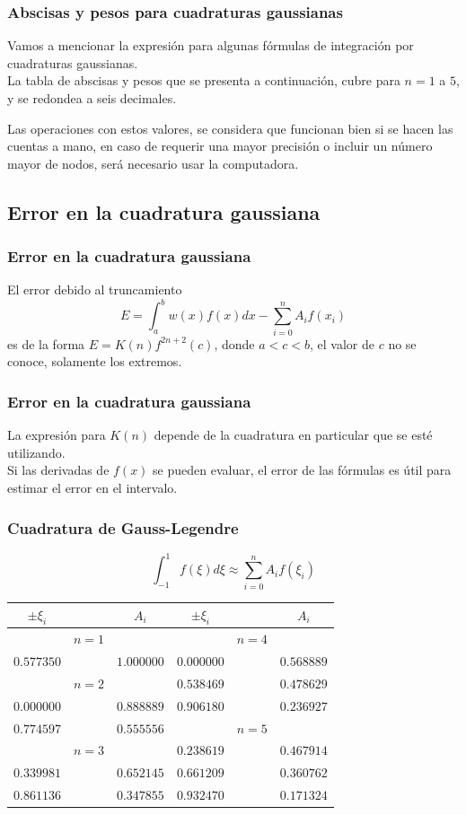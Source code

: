 \begin{frame}
\frametitle{Abscisas y pesos para cuadraturas gaussianas}
Vamos a mencionar la expresión para algunas fórmulas de integración por cuadraturas gaussianas.
\\
\bigskip
La tabla de abscisas y pesos que se presenta a continuación, cubre para $n=1$ a $5$, y se redondea a seis decimales.
\end{frame}
\begin{frame}
Las operaciones con estos valores, se considera que funcionan bien si se hacen las cuentas a mano, en caso de requerir una mayor precisión o incluir un número  mayor de nodos, será necesario usar la computadora.
\end{frame}
\subsection{Error en la cuadratura gaussiana}
\begin{frame}
\frametitle{Error en la cuadratura gaussiana}
El error debido al truncamiento
\[ E = \int_{a}^{b} w(x) f(x) dx  - \sum_{i=0}^{n} A_{i} f(x_{i})\]
es de la forma $E= K(n) f^{2n+2} (c) $, donde $a<c<b$, el valor de $c$ no se conoce, solamente los extremos.
\end{frame}
\begin{frame}
\frametitle{Error en la cuadratura gaussiana}
La expresión para $K(n)$ depende de la cuadratura en particular que se esté utilizando.
\\
\bigskip
Si las derivadas de $f(x)$ se pueden evaluar, el error de las fórmulas es útil para estimar el error en el intervalo.
\end{frame}
\begin{frame}[plain]
\frametitle{Cuadratura de Gauss-Legendre}
\[ \int_{-1}^{1} f(\xi) d \xi \approx \sum_{i=0}^{n} A_{i} f(\xi_{i}) \]
\fontsize{10}{10}\selectfont
\begin{center}
\begin{tabular}{|c c c | c c c|}
\hline
$\pm \xi_{i}$ &       & $A_{i}$    & $\pm \xi_{i}$ &       & $A_{i}$ \\ \hline
             & $n=1$ &            &               & $n=4$ &         \\ %
$0.577350$    &       & $1.000000$ & $0.000000$    &       & $0.568889$ \\ %
             & $n=2$ &            & $0.538469$    &       & $0.478629$ \\ %
$0.000000$    &       & $0.888889$ & $0.906180$    &       & $0.236927$ \\ %
$0.774597$    &       & $0.555556$ &               & $n=5$ &            \\ %
             & $n=3$ &            & $0.238619$    &       & $0.467914$ \\ %
$0.339981$    &       & $0.652145$ & $0.661209$    &       & $0.360762$ \\ %
$0.861136$    &       & $0.347855$ & $0.932470$    &       & $0.171324$ \\ \hline
\end{tabular}
\end{center}
\end{frame}
